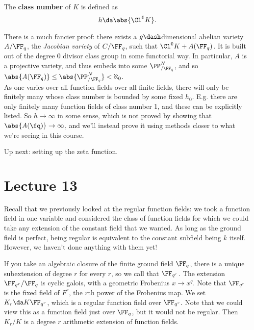 \begin{definition}

The \textbf{class number} of \(K\) is defined as
\begin{align*}  
h \da \abs{\Cl^0 K}
.\end{align*}

\end{definition}

\begin{remark}

There is a much fancier proof: there exists a \(g\dash\)dimensional
abelian variety \(A / \FF_q\), the \emph{Jacobian variety} of
\(C/\FF_q\), such that \(\Cl^0 K + A(\FF_q)\). It is built out of the
degree 0 divisor class group in some functorial way. In particular,
\(A\) is a projective variety, and thus embeds into some
\(\PP^N_{/\FF_q}\), and so
\(\abs{A(\FF_q)} \leq \abs{\PP^N_{/\FF_q}} < \aleph_0\).\\

As one varies over all function fields over all finite fields, there
will only be finitely many whose class number is bounded by some fixed
\(h_0\). E.g. there are only finitely many function fields of class
number 1, and these can be explicitly listed. So \(h\to \infty\) in some
sense, which is not proved by showing that \(\abs{A(\fq)} \to \infty\),
and we'll instead prove it using methods closer to what we're seeing in
this course.

\end{remark}

Up next: setting up the zeta function.

\hypertarget{lecture-13}{%
\section{Lecture 13}\label{lecture-13}}

Recall that we previously looked at the regular function fields: we took
a function field in one variable and considered the class of function
fields for which we could take any extension of the constant field that
we wanted. As long as the ground field is perfect, being regular is
equivalent to the constant subfield being \(k\) itself. However, we
haven't done anything with them yet!

If you take an algebraic closure of the finite ground field \(\FF_q\),
there is a unique subextension of degree \(r\) for every \(r\), so we
call that \(\FF_{q^r}\). The extension \(\FF_{q^r}/\FF_q\) is cyclic
galois, with a geometric Frobenius \(x\to x^q\). Note that \(\FF_{q^r}\)
is the fixed field of \(F^r\), the \(r\)th power of the Frobenius map.
We set \(K_r \da K \FF_{q^r}\), which is a regular function field over
\(\FF_{q^r}\). Note that we could view this as a function field just
over \(\FF_q\), but it would not be regular. Then \(K_r/K\) is a degree
\(r\) arithmetic extension of function fields.


